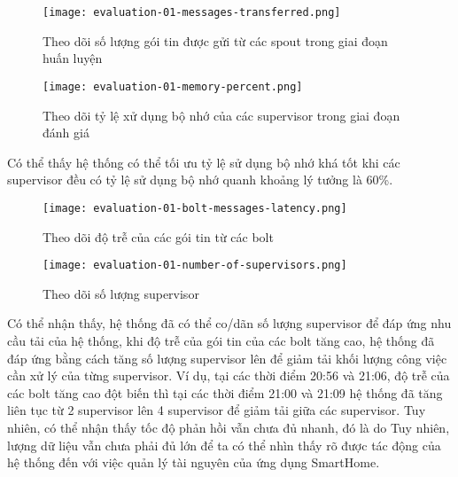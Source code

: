 \begin{figure}[H]
    \centering
    \texttt{[image: evaluation-01-messages-transferred.png]}
    \caption{Theo dõi số lượng gói tin được gửi từ các spout trong giai đoạn huấn luyện}
\end{figure}

\begin{figure}[H]
    \centering
    \texttt{[image: evaluation-01-memory-percent.png]}
    \caption{Theo dõi tỷ lệ xử dụng bộ nhớ của các supervisor trong giai đoạn đánh giá}
\end{figure}

Có thể thấy hệ thống có thể tối ưu tỷ lệ sử dụng bộ nhớ khá tốt khi các supervisor đều có tỷ lệ sử dụng bộ nhớ quanh khoảng lý tưởng là 60\%.

\begin{figure}[H]
    \centering
    \texttt{[image: evaluation-01-bolt-messages-latency.png]}
    \caption{Theo dõi độ trễ của các gói tin từ các bolt}
\end{figure}

\begin{figure}[H]
    \centering
    \texttt{[image: evaluation-01-number-of-supervisors.png]}
    \caption{Theo dõi số lượng supervisor}
\end{figure}

Có thể nhận thấy, hệ thống đã có thể co/dãn số lượng supervisor để đáp ứng nhu cầu tải của hệ thống, khi độ trễ của gói tin của các bolt tăng cao, hệ thống đã đáp ứng bằng cách tăng số lượng supervisor lên để giảm tải khối lượng công việc cần xử lý của từng supervisor. Ví dụ, tại các thời điểm 20:56 và 21:06, độ trễ của các bolt tăng cao đột biến thì tại các thời điểm 21:00 và 21:09 hệ thống đã tăng liên tục từ 2 supervisor lên 4 supervisor để giảm tải giữa các supervisor. Tuy nhiên, có thể nhận thấy tốc độ phản hồi vẫn chưa đủ nhanh, đó là do
Tuy nhiên, lượng dữ liệu vẫn chưa phải đủ lớn để ta có thể nhìn thấy rõ được tác động của hệ thống đến với việc quản lý tài nguyên của ứng dụng SmartHome.